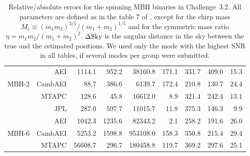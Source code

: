 \documentclass{iopart}
\begin{document}
\begin{table}
\begin{center}
\begin{tabular}{lr|rrrrrrr}
\hline
                & AEI            & 1114.1 & 952.2 & 38160.8 & 171.1 & 331.7 & 409.0 &  15.3 \\
MBH-2   & CambAEI &      88.7 & 386.6 &   6139.7 & 172.4 & 210.8 & 130.7 &  24.4  \\
                & MTAPC    &   128.6 &   45.8 & 16612.0 &      8.9 & 321.4 & 242.4 &  13.1  \\
                & JPL           &   287.0 & 597.7 & 11015.7 &   11.8 & 375.3 & 146.3 &    9.9 \\

\hline
                & AEI            &    1042.3 & 1235.6 &   82343.2 &      2.1 & 258.2 & 191.6 & 26.0  \\
MBH-6   & CambAEI &    5253.2 & 1598.8 & 953108.0 & 158.3 & 350.8 & 215.4 & 29.4  \\
                & MTAPC    & 56608.7 &    296.7 & 180458.8 & 119.7 & 369.2 & 297.6 & 25.1  \\


\hline
\end{tabular}
\end{center}
\caption{ Relative/absolute errors for the spinning MBH binaries in Challenge~3.2. All parameters are defined as in the table 7 of \cite{MLDC3}, except for the chirp mass $M_c \equiv (m_1 m_2)^{3/5} / (m_1 + m_2)^{1/5}$ and for the symmetric mass ratio $\eta = m_1 m_2 / (m_1 + m_2)^{2}$.  $ \Delta \textmd{Sky}$ is the angular distance in the sky between 
the true and the estimated positions. We used only the mode with the highest SNR in all tables, if several modes per group were submitted.
\label{tab:SMBH_Err}}
\end{table} 
\end{document}
